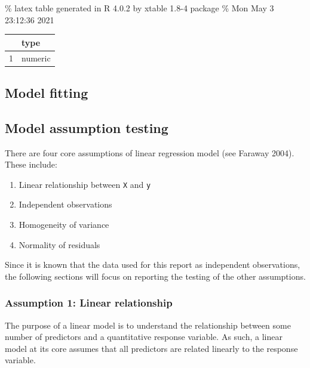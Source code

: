 \documentclass{article}
\begin{document}
\% latex table generated in R 4.0.2 by xtable 1.8-4 package \% Mon May 3
23:12:36 2021

\begin{table}[ht]
\centering
\begin{tabular}{rl}
  \hline
 & type \\ 
  \hline
1 & numeric \\ 
   \hline
\end{tabular}
\end{table}

\hypertarget{model-fitting}{%
\subsection{Model fitting}\label{model-fitting}}

\hypertarget{model-assumption-testing}{%
\subsection{Model assumption testing}\label{model-assumption-testing}}

There are four core assumptions of linear regression model (see Faraway
2004). These include:

\begin{enumerate}
\def\labelenumi{\arabic{enumi}.}
\tightlist
\item
  Linear relationship between \texttt{X} and \texttt{y}
\item
  Independent observations
\item
  Homogeneity of variance
\item
  Normality of residuals
\end{enumerate}

Since it is known that the data used for this report as independent
observations, the following sections will focus on reporting the testing
of the other assumptions.

\hypertarget{assumption-1-linear-relationship}{%
\subsubsection{Assumption 1: Linear
relationship}\label{assumption-1-linear-relationship}}

The purpose of a linear model is to understand the relationship between
some number of predictors and a quantitative response variable. As such,
a linear model at its core assumes that all predictors are related
linearly to the response variable.
\end{document}
